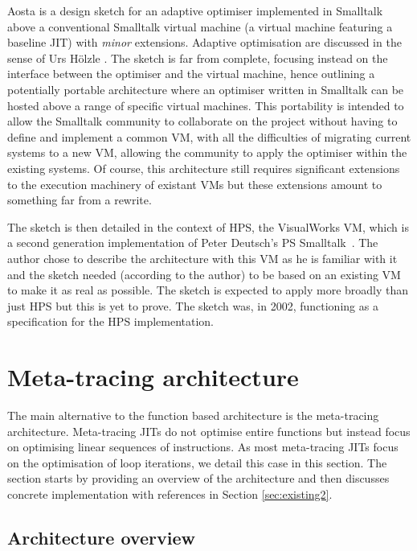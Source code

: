 \documentclass[a4paper,12pt,twoside]{../includes/ThesisStyle}
\begin{document}
Aosta is a design sketch for an adaptive optimiser implemented in Smalltalk above a conventional Smalltalk virtual machine (a virtual machine featuring a baseline JIT) with \emph{minor} extensions. Adaptive optimisation are discussed in the sense of Urs H\"olzle \cite{UrsPHD}. The sketch is far from complete, focusing instead on the interface between the optimiser and the virtual machine, hence outlining a potentially portable architecture where an optimiser written in Smalltalk can be hosted above a range of specific virtual machines. This portability is intended to allow the Smalltalk community to collaborate on the project without having to define and implement a common VM, with all the difficulties of migrating current systems to a new VM, allowing the community to apply the optimiser within the existing systems.  Of course, this architecture still requires significant extensions to the execution machinery of existant VMs but these extensions amount to something far from a rewrite.

The sketch is then detailed in the context of HPS, the VisualWorks VM, which is a second generation implementation of Peter Deutsch's PS Smalltalk~\cite{Deut84a}. The author chose to describe the architecture with this VM as he is familiar with it and the sketch needed (according to the author) to be based on an existing VM to make it as real as possible. The sketch is expected to apply more broadly than just HPS but this is yet to prove. The sketch was, in 2002, functioning as a specification for the HPS implementation. 


\section{Meta-tracing architecture}
\label{sec:metaArchitecture}

The main alternative to the function based architecture is the meta-tracing architecture. Meta-tracing JITs do not optimise entire functions but instead focus on optimising linear sequences of instructions. As most meta-tracing JITs focus on the optimisation of loop iterations, we detail this case in this section. The section starts by providing an overview of the architecture and then discusses concrete implementation with references in Section \ref{sec:existing2}.

\subsection{Architecture overview}
\end{document}
